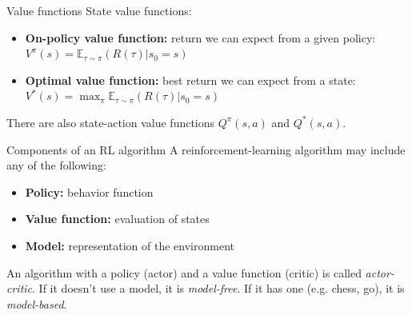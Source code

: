 \documentclass[11pt, aspectratio=169]{beamer}
\begin{document}
\begin{frame}{Value functions}
    State value functions:
    \begin{itemize}
        \item \textbf{On-policy value function:} return we can expect from a given policy: $V^\pi(s) = \mathbb{E}_{\tau \sim \pi}(R(\tau) | s_0 = s)$
        \item \textbf{Optimal value function:} best return we can expect from a state: $V^*(s) = \max_\pi \mathbb{E}_{\tau \sim \pi}(R(\tau) | s_0 = s)$
    \end{itemize}
    There are also state-action value functions $Q^\pi(s, a)$ and $Q^*(s, a)$.
\end{frame}

\begin{frame}{Components of an RL algorithm}
    A reinforcement-learning algorithm may include any of the following:
    \begin{itemize}
        \item \textbf{Policy:} behavior function
        \item \textbf{Value function:} evaluation of states
        \item \textbf{Model:} representation of the environment
    \end{itemize}
    An algorithm with a policy (actor) and a value function (critic) is called \emph{actor-critic}. If it doesn't use a model, it is \emph{model-free}. If it has one (e.g. chess, go), it is \emph{model-based}.
\end{frame}
\end{document}

